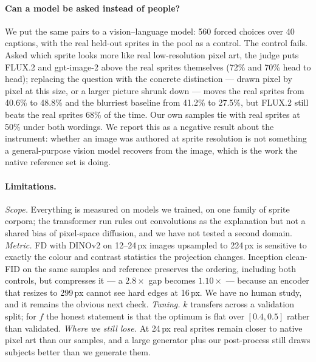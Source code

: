 \documentclass[10pt,twocolumn,letterpaper]{article}
\begin{document}
\paragraph{Can a model be asked instead of people?}
We put the same pairs to a vision--language model: 560 forced choices over 40 captions, with the real held-out sprites
in the pool as a control. The control fails. Asked which sprite looks more like real low-resolution pixel art, the
judge puts FLUX.2 and gpt-image-2 above the real sprites themselves (72\% and 70\% head to head); replacing the
question with the concrete distinction --- drawn pixel by pixel at this size, or a larger picture shrunk down --- moves
the real sprites from 40.6\% to 48.8\% and the blurriest baseline from 41.2\% to 27.5\%, but FLUX.2 still beats the
real sprites 68\% of the time. Our own samples tie with real sprites at 50\% under both wordings. We report this as a
negative result about the instrument: whether an image was authored at sprite resolution is not something a
general-purpose vision model recovers from the image, which is the work the native reference set is doing.

\paragraph{Limitations.}
\emph{Scope.} Everything is measured on models we trained, on one family of sprite corpora; the transformer run rules
out convolutions as the explanation but not a shared bias of pixel-space diffusion, and we have not tested a second
domain. \emph{Metric.} FD with DINOv2 on 12--24\,px images upsampled to 224\,px is sensitive to exactly the colour and
contrast statistics the projection changes. Inception clean-FID on the same samples and reference preserves the
ordering, including both controls, but compresses it --- a $2.8\times$ gap becomes $1.10\times$ --- because an encoder
that resizes to 299\,px cannot see hard edges at 16\,px. We have no human study, and it remains the obvious next check.
\emph{Tuning.} $k$ transfers across a validation split; for $f$ the honest statement is that the optimum is flat over
$[0.4, 0.5]$ rather than validated. \emph{Where we still lose.} At 24\,px real sprites remain closer to native pixel
art than our samples, and a large generator plus our post-process still draws subjects better than we generate them.

{\small


}
\end{document}
